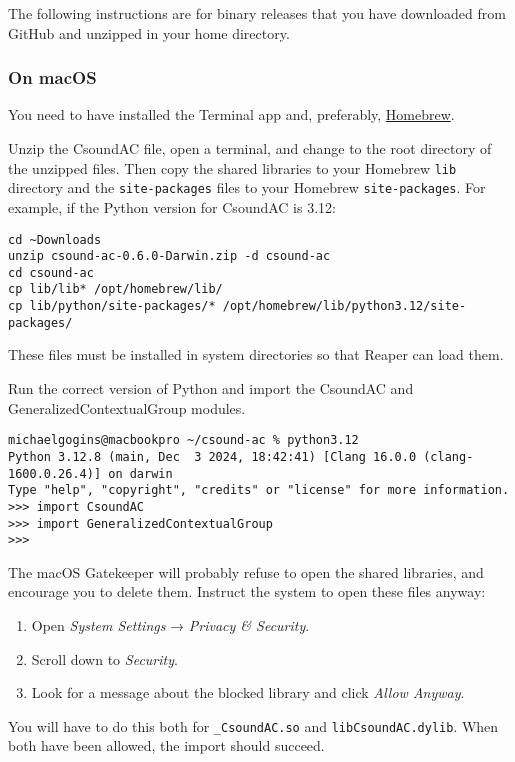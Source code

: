 \documentclass[letterpaper,10pt,DIV=12,parskip=half]{scrartcl}
\begin{document}
The following instructions are for binary releases that you have downloaded from GitHub and unzipped in your home directory.

\subsubsection{On macOS}

You need to have installed the Terminal app and, preferably, \href{https://brew.sh/}{Homebrew}.

Unzip the CsoundAC file, open a terminal, and change to the root directory of the unzipped files. Then copy the shared libraries to your Homebrew \lstinline|lib| directory and the \lstinline|site-packages| files to your Homebrew \lstinline|site-packages|. For example, if the Python version for CsoundAC is 3.12:

\begin{lstlisting}
cd ~Downloads
unzip csound-ac-0.6.0-Darwin.zip -d csound-ac
cd csound-ac
cp lib/lib* /opt/homebrew/lib/
cp lib/python/site-packages/* /opt/homebrew/lib/python3.12/site-packages/
\end{lstlisting}

These files must be installed in system directories so that Reaper can load them.

Run the correct version of Python and import the CsoundAC and GeneralizedContextualGroup modules. 

\begin{lstlisting}[basicstyle=\small\ttfamily]
michaelgogins@macbookpro ~/csound-ac % python3.12
Python 3.12.8 (main, Dec  3 2024, 18:42:41) [Clang 16.0.0 (clang-1600.0.26.4)] on darwin
Type "help", "copyright", "credits" or "license" for more information.
>>> import CsoundAC
>>> import GeneralizedContextualGroup
>>> 
\end{lstlisting}

The macOS Gatekeeper will probably refuse to open the shared libraries, and encourage you to delete them. Instruct the system to open these files anyway:

\begin{enumerate}
\item Open \emph{System Settings} → \emph{Privacy \& Security}.
\item Scroll down to \emph{Security}.
\item Look for a message about the blocked library and click \emph{Allow Anyway}.
\end{enumerate}

You will have to do this both for \lstinline|_CsoundAC.so| and \lstinline|libCsoundAC.dylib|. When both have been allowed, the import should succeed.
\end{document}
